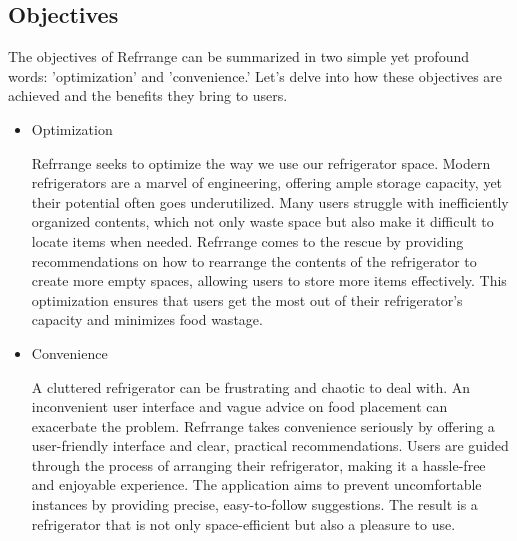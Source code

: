 \documentclass[conference]{IEEEtran}
\begin{document}
\subsection{Objectives}
The objectives of Refrrange can be summarized in two simple yet profound words: 'optimization' and 'convenience.' Let's delve into how these objectives are achieved and the benefits they bring to users.
\begin{itemize}
    \item Optimization\par
    Refrrange seeks to optimize the way we use our refrigerator space. Modern refrigerators are a marvel of engineering, offering ample storage capacity, yet their potential often goes underutilized. Many users struggle with inefficiently organized contents, which not only waste space but also make it difficult to locate items when needed. Refrrange comes to the rescue by providing recommendations on how to rearrange the contents of the refrigerator to create more empty spaces, allowing users to store more items effectively. This optimization ensures that users get the most out of their refrigerator's capacity and minimizes food wastage.
    \item Convenience\par
    A cluttered refrigerator can be frustrating and chaotic to deal with. An inconvenient user interface and vague advice on food placement can exacerbate the problem. Refrrange takes convenience seriously by offering a user-friendly interface and clear, practical recommendations. Users are guided through the process of arranging their refrigerator, making it a hassle-free and enjoyable experience. The application aims to prevent uncomfortable instances by providing precise, easy-to-follow suggestions. The result is a refrigerator that is not only space-efficient but also a pleasure to use.
\end{itemize}
\end{document}
